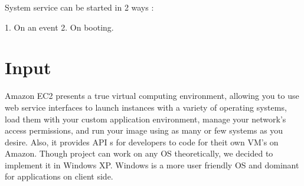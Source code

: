  
System service can be started in 2 ways :

1.  On an event
2.	On booting.

\section{Input}

Amazon EC2 presents a true virtual computing environment, allowing you to use web service interfaces to launch instances with a variety of operating systems, load them with your custom application environment, manage your network’s access permissions, and run your image using as many or few systems as you desire. Also, it provides API s for developers to code for theit own VM’s on Amazon. 
  Though project can work on any OS theoretically, we decided to implement it in Windows XP. Windows is a more user friendly OS and dominant for applications on client side. 




